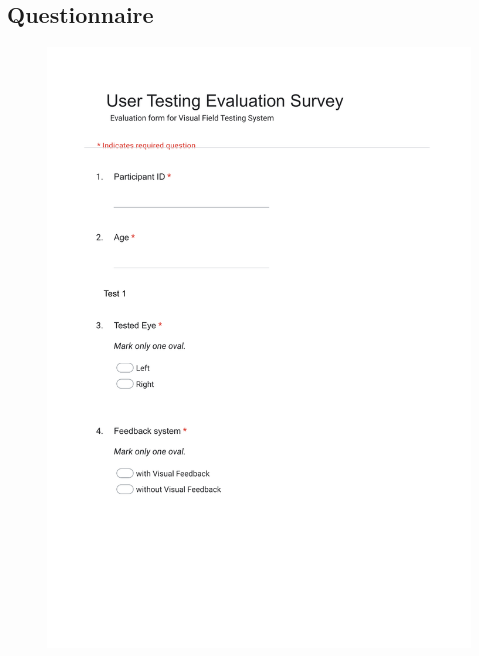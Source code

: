 \documentclass{l4proj}
\begin{document}
\begin{appendices}
\subsection{Questionnaire}
\begin{figure}
    \centering
    \includegraphics[page=1, width=1\linewidth]{images/User Testing Evaluation Form.pdf}
\end{figure}
\begin{figure}
    \centering

\end{figure}
\end{appendices}
\end{document}
